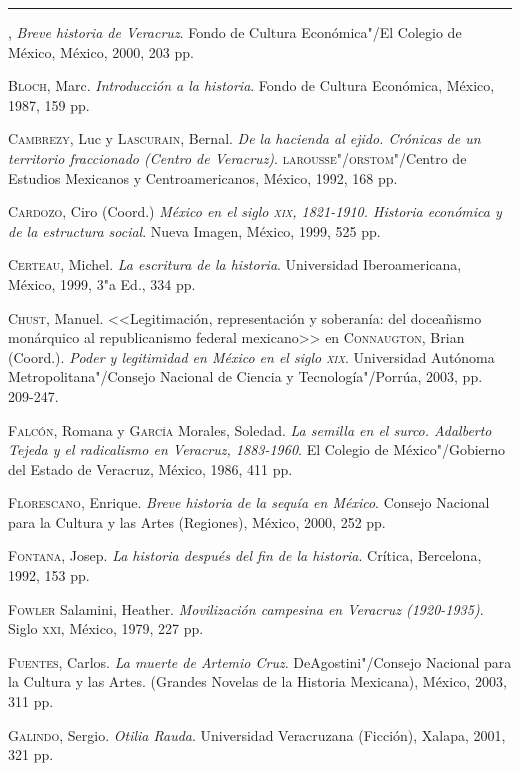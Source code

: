 \documentclass[14pt,twoside,final]{extbook} %
\begin{document}
\rule{1cm}{0.4pt}, \emph{Breve historia de Veracruz}. Fondo de Cultura Económica"/El Colegio de México, México, 2000, 203 pp.

\textsc{Bloch}, Marc. \emph{Introducción a la historia}. Fondo de Cultura Económica, México, 1987, 159 pp.

\textsc{Cambrezy}, Luc y \textsc{Lascurain}, Bernal. \emph{De la hacienda al ejido. Crónicas de un territorio fraccionado (Centro de Veracruz)}. \textsc{larousse"/orstom}"/Centro de Estudios Mexicanos y Centroamericanos, México, 1992, 168 pp.

\textsc{Cardozo}, Ciro (Coord.) \emph{México en el siglo \textsc{xix}, 1821-1910. Historia económica y de la estructura social}. Nueva Imagen, México, 1999, 525 pp.

\textsc{Certeau}, Michel. \emph{La escritura de la historia}. Universidad Iberoamericana, México, 1999, 3"a Ed., 334 pp.

\textsc{Chust}, Manuel. <<Legitimación, representación y soberanía: del doceañismo
monárquico al republicanismo federal mexicano>> en \textsc{Connaugton}, Brian (Coord.). \emph{Poder y legitimidad en México en el siglo \textsc{xix}}. Universidad Autónoma Metropolitana"/Consejo Nacional de Ciencia y Tecnología"/Porrúa, 2003, pp. 209-247.

\textsc{Falcón}, Romana y \textsc{García} Morales, Soledad. \emph{La semilla en el surco. Adalberto Tejeda y el radicalismo en Veracruz, 1883-1960}. El Colegio de México"/Gobierno del
Estado de Veracruz, México, 1986, 411 pp.

\textsc{Florescano}, Enrique. \emph{Breve historia de la sequía en México}. Consejo Nacional para la Cultura y las Artes (Regiones), México, 2000, 252 pp.

\textsc{Fontana}, Josep. \emph{La historia después del fin de la historia}. Crítica, Bercelona, 1992, 153 pp.

\textsc{Fowler} Salamini, Heather. \emph{Movilización campesina en Veracruz (1920-1935)}. Siglo \textsc{xxi}, México, 1979, 227 pp.

\textsc{Fuentes}, Carlos. \emph{La muerte de Artemio Cruz}. DeAgostini"/Consejo Nacional para la Cultura y las Artes. (Grandes Novelas de la Historia Mexicana), México, 2003, 311 pp.

\textsc{Galindo}, Sergio. \emph{Otilia Rauda}. Universidad Veracruzana (Ficción), Xalapa, 2001, 321 pp.
\end{document}
